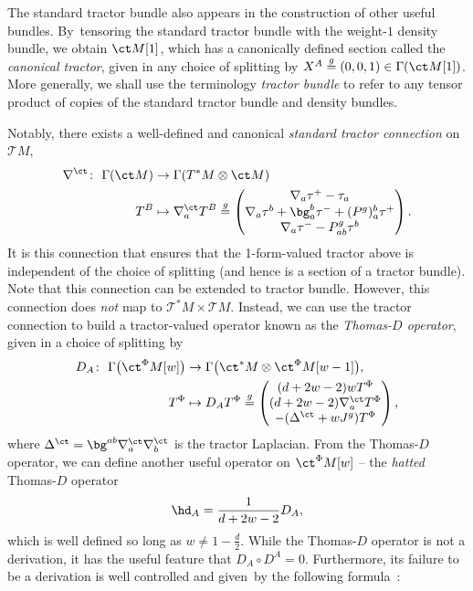 The standard tractor bundle also appears in the construction of other useful bundles. By~tensoring the standard tractor bundle with the weight-$1$ density bundle, we obtain $\ct M[1]$, which has a canonically defined section called the \textit{canonical tractor}, given in any choice of splitting by $X^A \stackrel{g}{=} (0,0,1) \in \Gamma(\ct M[1])$. More generally, we shall use the terminology \textit{tractor bundle} to refer to any tensor product of copies of the standard tractor bundle and density bundles.

Notably, there exists a well-defined and canonical \textit{standard tractor connection} on $\mathcal{T}M$,
\begin{align*}
\nabla^\ct \colon \ \Gamma(\ct M) &\rightarrow \Gamma(T^* M \otimes \ct M) \\
T^B &\mapsto \nabla^\ct_a T^B \stackrel{g}{=} \begin{pmatrix} \nabla_a \tau^+ - \tau_a \\ \nabla_a \tau^b + \bg_a^b \tau^- + (P^g)_a^b \tau^+ \\ \nabla_a \tau^- - P^g_{ab} \tau^b \end{pmatrix} .
\end{align*}
It is this connection that ensures that the 1-form-valued tractor above is independent of the choice of splitting (and hence is a section of a tractor bundle). Note that this connection can be extended to tractor bundle. However, this connection does \textit{not} map to $\mathcal{T}^* M \times \mathcal{T}M$. Instead, we can use the tractor connection to build a tractor-valued operator known as the \textit{Thomas-$D$ operator}, given in a choice of splitting by
\begin{align*}
D_A \colon \ \Gamma\bigl(\ct^\Phi M[w]\bigr) &\rightarrow \Gamma\bigl(\ct^* M \otimes \ct^\Phi M[w-1]\bigr), \\
T^\Phi &\mapsto D_A T^\Phi \stackrel{g}{=} \begin{pmatrix}
(d+2w-2)w T^\Phi \\
(d+2w-2) \nabla^\ct_a T^\Phi \\
-(\Delta^\ct + w J^g) T^\Phi
\end{pmatrix} ,
\end{align*}
where $\Delta^\ct = \bg^{ab} \nabla^\ct_a \nabla^\ct_b$ is the tractor Laplacian. From the Thomas-$D$ operator, we can define another useful operator on $\ct^\Phi M[w]$ -- the \textit{hatted} Thomas-$D$ operator
\[\hd_A = \frac{1}{d+2w-2} D_A ,\]
which is well defined so long as $w \neq 1 - \frac{d}{2}$. While the Thomas-$D$ operator is not a derivation, it has the useful feature that $D_A \circ D^A = 0$. Furthermore, its failure to be a derivation is well controlled and given~by the following formula~\cite{Will1}:
